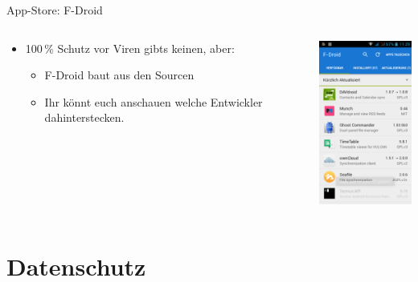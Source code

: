 \documentclass{beamer}
\begin{document}
\begin{frame}{App-Store: F-Droid}
\begin{columns}[c]
\begin{column}[T]{.7\textwidth}
    \vspace{-2cm}
      \begin{itemize}
      \item 100\,\% Schutz vor Viren gibts keinen, aber:
        \begin{itemize}
          \item F-Droid baut aus den Sourcen
          \item  Ihr könnt euch anschauen welche Entwickler dahinterstecken.
        \end{itemize}
      \end{itemize}
   \end{column}
  \begin{column}[T]{.3\textwidth}
    \vspace{-6.1cm}
    \includegraphics[width=3.5cm]{fdroid.png} 
   \end{column}
\end{columns}

\end{frame}

\section{Datenschutz}
\end{document}
